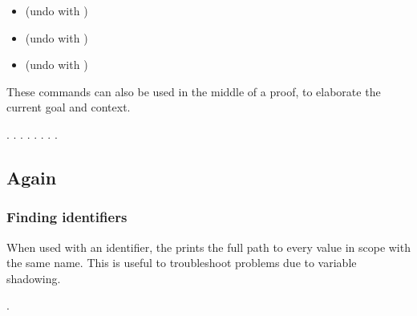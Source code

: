 \documentclass[12pt]{report}
\begin{document}
\begin{itemize}
\item  {}   (undo with   )

\item  {}   (undo with   )

\item  {}   (undo with   )

\end{itemize}


    These commands can also be used in the middle of a proof, to
    elaborate the current goal and context. 
\begin{coqdoccode}
\coqdocemptyline
\coqdocnoindent
{}  .\coqdoceol
\coqdocnoindent
{} .\coqdoceol
\coqdocnoindent
{}  .\coqdoceol
\coqdocemptyline
\coqdocnoindent
{} .\coqdoceol
\coqdocemptyline
\coqdocnoindent
{}.\coqdoceol
\coqdocnoindent
{} .\coqdoceol
\coqdocemptyline
\coqdocnoindent
{} .\coqdoceol
\coqdocnoindent
{}.\coqdoceol
\coqdocemptyline
\end{coqdoccode}
\subsection{\texorpdfstring{\protect{}}{Locate} Again}


\begin{coqdoccode}
\coqdocemptyline
\end{coqdoccode}
\subsubsection{Finding identifiers}



 When used with an identifier, the  prints the full path to
    every value in scope with the same name.  This is useful to
    troubleshoot problems due to variable shadowing. 
\begin{coqdoccode}
\coqdocnoindent
{} .\coqdoceol
\end{coqdoccode}
\end{document}
